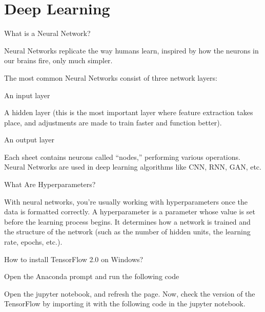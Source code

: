 	\chapter{Deep Learning}
	\resetquestioncounter{}
	\begin{qanda}
		\begin{question}
What is a Neural Network?
		\end{question}
		\begin{answer}
Neural Networks replicate the way humans learn, inspired by how the neurons in our brains fire, only much simpler.

The most common Neural Networks consist of three network layers:
	\begin{bulletedlist}
		\item An input layer
		\item A hidden layer (this is the most important layer where feature extraction takes place, and adjustments are made to train faster and function better).
		\item An output layer
	\end{bulletedlist}
 Each sheet contains neurons called ``nodes,'' performing various operations. Neural Networks are used in deep learning algorithms like CNN, RNN, GAN, etc.
		\end{answer}
	\end{qanda}


	\begin{qanda}
		\begin{question}
			What Are Hyperparameters?
		\end{question}
		\begin{answer}
With neural networks, you're usually working with hyperparameters once the data is formatted correctly. A hyperparameter is a parameter whose value is set before the learning process begins. It determines how a network is trained and the structure of the network (such as the number of hidden units, the learning rate, epochs, etc.).
		\end{answer}
	\end{qanda}

 
	\begin{qanda}
		\begin{question}
How to install TensorFlow 2.0 on Windows?
		\end{question}
		\begin{answer}
Open the Anaconda prompt and run the following code

Open the jupyter notebook, and refresh the page. Now, check the version of the TensorFlow by importing it with the following code in the jupyter notebook.

		\end{answer}
	\end{qanda}


